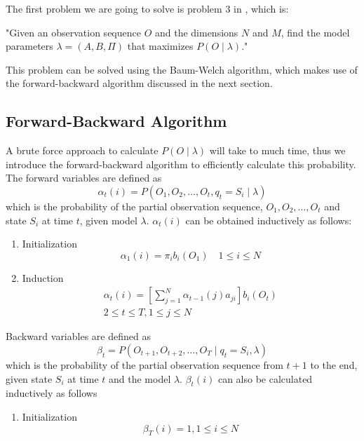\documentclass[twoside]{article}
\begin{document}
\begin{multicols}{2}
The first problem we are going to solve is problem 3 in \cite{Rabiner89}, which is:

"Given an observation sequence $O$ and the dimensions $N$ and $M$, find the model parameters $\lambda=(A,B,\Pi)$ that maximizes $P(O\mid \lambda)$."

This problem can be solved using the Baum-Welch algorithm, which makes use of the forward-backward algorithm discussed in the next section.

\subsection{Forward-Backward Algorithm}
A brute force approach to calculate $P(O\mid \lambda)$ will take to much time, thus we introduce the forward-backward algorithm to efficiently calculate this probability.\\
The forward variables are defined as
\begin{equation}
\alpha_t(i) = P(O_1, O_2, \ldots, O_t, q_t = S_i \mid \lambda)
\end{equation}
which is the probability of the partial observation sequence, $O_1, O_2, \ldots, O_t$ and state $S_i$ at time $t$, given model $\lambda$. $\alpha_t(i)$ can be obtained inductively as follows:
\begin{enumerate}
\item Initialization
\begin{equation}
\alpha_1(i) = \pi_i b_i(O_1) \quad 1 \leq i \leq N
\end{equation}
\item Induction
\begin{multline}
\alpha_t(i)=\left[\sum_{j=1}^N\alpha_{t-1}(j)a_{ji} \right]b_i(O_t) \\ 2 \leq t \leq T, 1 \leq j \leq N
\end{multline}
\end{enumerate}
Backward variables are defined as
\begin{equation}
\beta_t = P(O_{t+1}, O_{t+2}, \ldots, O_{T}\mid q_t = S_i, \lambda)
\end{equation}
which is the probability of the partial observation sequence from $t+1$ to the end, given state $S_i$ at time $t$ and the model $\lambda$. $\beta_t(i)$ can also be calculated inductively as follows
\begin{enumerate}
\item Initialization
\begin{equation}
\beta_T(i) = 1, 1 \leq i \leq N
\end{equation}

\end{enumerate}
\end{multicols}
\end{document}
